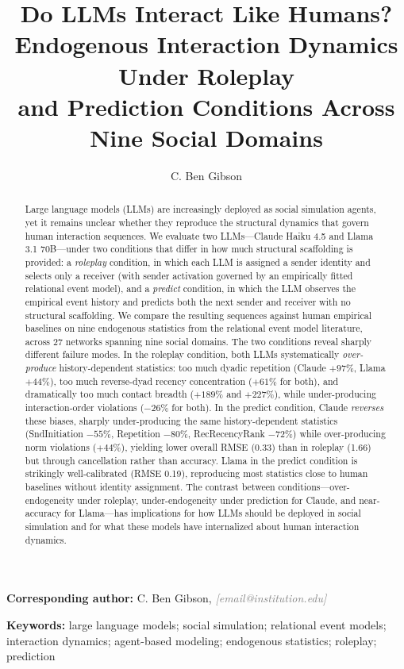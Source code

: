 \documentclass[11pt]{article}
\title{Do LLMs Interact Like Humans? \\ Endogenous Interaction Dynamics Under Roleplay \\ and Prediction Conditions Across Nine Social Domains}
\author[1]{C. Ben Gibson}
\affil[1]{\placeholder{Department, Institution, City, Country}}
\newcommand{\placeholder}[1]{\textcolor{gray}{\textit{[#1]}}}
\begin{document}
\maketitle

\noindent\textbf{Corresponding author:} C. Ben Gibson,
\placeholder{email@institution.edu}

\begin{abstract}
Large language models (LLMs) are increasingly deployed as social simulation
agents, yet it remains unclear whether they reproduce the structural dynamics
that govern human interaction sequences. We evaluate two LLMs---Claude Haiku
4.5 and Llama 3.1 70B---under two conditions that differ in how much
structural scaffolding is provided: a \emph{roleplay} condition, in which each
LLM is assigned a sender identity and selects only a receiver (with sender
activation governed by an empirically fitted relational event model), and a
\emph{predict} condition, in which the LLM observes the empirical event
history and predicts both the next sender and receiver with no structural
scaffolding. We compare the resulting sequences against human empirical
baselines on nine endogenous statistics from the relational event model
literature, across 27 networks spanning nine social domains. The two
conditions reveal sharply different failure modes. In the roleplay condition,
both LLMs systematically \emph{over-produce} history-dependent statistics:
too much dyadic repetition (Claude $+97\%$, Llama $+44\%$), too much
reverse-dyad recency concentration ($+61\%$ for both), and dramatically
too much contact breadth ($+189\%$ and $+227\%$), while under-producing
interaction-order violations ($-26\%$ for both). In the predict condition,
Claude \emph{reverses} these biases, sharply under-producing the same
history-dependent statistics (SndInitiation $-55\%$, Repetition $-80\%$,
RecRecencyRank $-72\%$) while over-producing norm violations ($+44\%$),
yielding lower overall RMSE (0.33) than in roleplay (1.66) but through
cancellation rather than accuracy. Llama in the predict condition is
strikingly well-calibrated (RMSE 0.19), reproducing most statistics close
to human baselines without identity assignment. The contrast between
conditions---over-endogeneity under roleplay, under-endogeneity under
prediction for Claude, and near-accuracy for Llama---has implications for
how LLMs should be deployed in social simulation and for what these models
have internalized about human interaction dynamics.
\end{abstract}

\noindent\textbf{Keywords:} large language models; social simulation; relational
event models; interaction dynamics; agent-based modeling; endogenous statistics;
roleplay; prediction
\end{document}
